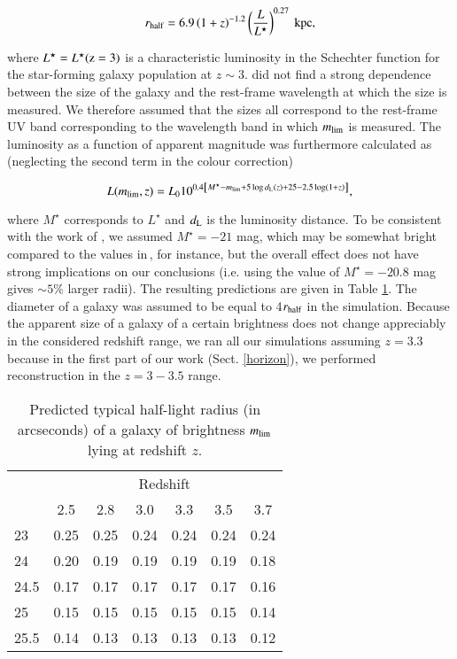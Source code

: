 \documentclass{aa}
\begin{document}
\begin{equation}
\label{size}
r_{\rm half} = 6.9\left( 1 + z\right)^{-1.2} \left( \frac{L}{L^{\star}}\right)^{0.27} ~\mathrm{kpc,}
\end{equation}

\noindent where $L^{\star} = L^{\star}({\rm z=3})$ is a characteristic luminosity in the Schechter function \citep{Schechter1976} for the star-forming galaxy population at $z \sim 3$.  \citet{Shibuya2015} did not find a strong dependence between the size of the galaxy and the rest-frame wavelength at which the size is measured. We therefore assumed that the sizes all correspond to the rest-frame UV band corresponding to the wavelength band in which $m_{\rm lim}$ is measured. The luminosity as a function of apparent magnitude was furthermore calculated as (neglecting the second term in the colour correction)

\begin{equation}
L(m_{\rm lim},z) = L_{0}10^{0.4\left[ M^{\star} - m_{\rm lim} + 5\log d_{\rm L}(z) + 25 - 2.5\log \left(1 + z\right)\right]},
\end{equation}

\noindent where $M^{\star}$ corresponds to $L^{\star}$ and $d_{\rm L}$ is the luminosity distance. To be consistent with the work of \citet{Shibuya2015}, we assumed $M^{\star} = -21$ mag, which may be somewhat bright compared to the values in\,\citet{Bouwens2015}, for instance, but the overall effect does not have strong implications on our conclusions (i.e. using the value of $M^{\star} = -20.8$ mag \citep{Bouwens2015} gives $\sim 5 \%$ larger radii). The resulting predictions are given in Table \ref{tab1}. The diameter of a galaxy was assumed to be equal to 4$r_{\rm half}$ in the simulation. Because the apparent size of a galaxy of a certain brightness does not change appreciably in the considered redshift range, we ran all our simulations assuming $z = 3.3$ because in the first part of our work (Sect. \ref{horizon}), we performed reconstruction in the $z = 3 - 3.5$ range.

\begin{table}
\centering
\small
\renewcommand{\arraystretch}{1.5}
\begin{tabular}{lcccccc}
\hline
\hline
\vspace{-0.2cm}
\multirow{2}{*}{$m_{\rm lim}$} & \multicolumn{6}{c}{Redshift}\\
& 2.5 & 2.8 & 3.0 & 3.3 & 3.5 & 3.7\\
\hline
23   & 0.25 & 0.25 & 0.24 & 0.24 & 0.24 & 0.24\\
24   & 0.20 & 0.19 & 0.19 & 0.19 & 0.19 & 0.18\\
24.5 & 0.17 & 0.17 & 0.17 & 0.17 & 0.17 & 0.16\\
25   & 0.15 & 0.15 & 0.15 & 0.15 & 0.15 & 0.14\\
25.5 & 0.14 & 0.13 & 0.13 & 0.13 & 0.13 & 0.12\\
\hline
\end{tabular}
\caption{Predicted typical half-light radius (in arcseconds) of a galaxy of brightness $m_{\rm lim}$ lying at redshift $z$.}
\label{tab1}
\end{table}
\end{document}
